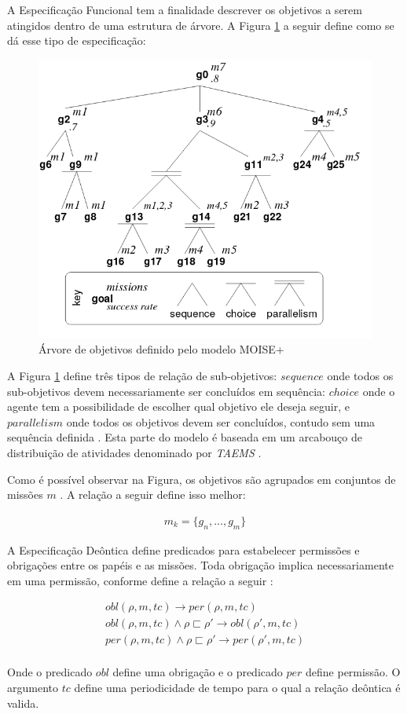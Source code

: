 A Especificação Funcional tem a finalidade descrever os objetivos a serem atingidos dentro de uma estrutura de árvore. A Figura \ref{arvoremoise} a seguir define como se dá esse tipo de especificação: 

\begin{figure}[H]
  \centering
  \includegraphics[width=0.8\linewidth]{figure/figmoise} 
  \caption{Árvore de objetivos definido pelo modelo MOISE+ \cite{moiseframework}}
  \label{arvoremoise}
\end{figure}

A Figura \ref{arvoremoise} define três tipos de relação de sub-objetivos: $sequence$ onde todos os sub-objetivos devem necessariamente ser concluídos em sequência: $choice$ onde o agente tem a possibilidade de escolher qual objetivo ele deseja seguir, e $parallelism$ onde todos os objetivos devem ser concluídos, contudo sem uma sequência definida \cite{taems01,taems02}. Esta parte do modelo é baseada em um arcabouço de distribuição de atividades denominado por \textit{TAEMS} \cite{TAEMS}. 

Como é possível observar na Figura, os objetivos são agrupados em conjuntos de missões $m$ \cite{dynamicagenttemporalstruct}. A relação a seguir define isso melhor:

\begin{eqnarray}
	m_k = \{ g_n,...,g_m\}
\end{eqnarray}


A Especificação Deôntica define predicados para estabelecer permissões e obrigações entre os papéis e as missões. Toda obrigação implica necessariamente em uma permissão, conforme define a relação a seguir \cite{moiseframework,deonticOne}: 

\begin{eqnarray}\nonumber \label{deonticRuleMoise}
	obl(\rho,m,tc) \to per(\rho,m,tc) \\
	obl(\rho,m,tc) \wedge \rho \sqsubset \rho' \to obl(\rho',m,tc) \\
	per(\rho,m,tc) \wedge \rho \sqsubset \rho' \to per(\rho',m,tc) \\	
\end{eqnarray}

Onde o predicado $obl$ define uma obrigação e o predicado $per$ define permissão. O argumento $tc$ define uma periodicidade de tempo para o qual a relação deôntica é valida. 